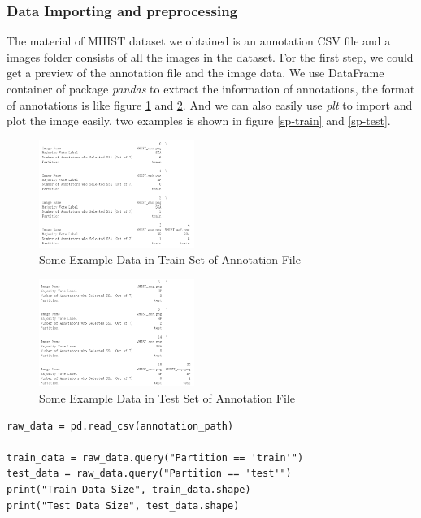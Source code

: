 \documentclass[conference]{IEEEtran}
\begin{document}
\subsubsection{Data Importing and preprocessing}

The material of MHIST dataset we obtained is an annotation CSV file and a images folder consists of all the images in the dataset. For the first step, we could get a preview of the annotation file and the image data. We use DataFrame container of package \textit{pandas} to extract the information of annotations, the format of annotations is like figure \ref{sd-train} and \ref{sd-test}. And we can also easily use \textit{plt} to import and plot the image easily, two examples is shown in figure \ref{sp-train} and \ref{sp-test}.

\begin{figure}[h] 
    \centering
    \includegraphics[width=0.45\textwidth]{./graphs/Task2/traindata-preview.png}
    \caption{Some Example Data in Train Set of Annotation File}
    \label{sd-train}
\end{figure}

\begin{figure}[h] 
    \centering
    \includegraphics[width=0.45\textwidth]{./graphs/Task2/testdata-preview.png}
    \caption{Some Example Data in Test Set of Annotation File}
    \label{sd-test}
\end{figure}
\begin{lstlisting}
raw_data = pd.read_csv(annotation_path)

train_data = raw_data.query("Partition == 'train'")
test_data = raw_data.query("Partition == 'test'")
print("Train Data Size", train_data.shape)
print("Test Data Size", test_data.shape)
\end{lstlisting}
\end{document}

